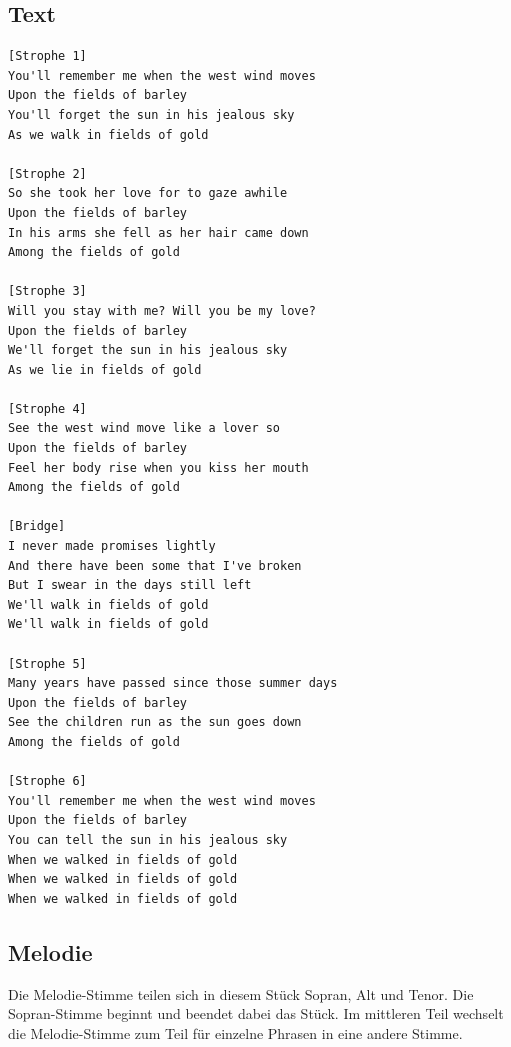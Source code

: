\subsection*{Text}

\begin{verbatim}
[Strophe 1]
You'll remember me when the west wind moves
Upon the fields of barley
You'll forget the sun in his jealous sky
As we walk in fields of gold

[Strophe 2]
So she took her love for to gaze awhile
Upon the fields of barley
In his arms she fell as her hair came down
Among the fields of gold

[Strophe 3]
Will you stay with me? Will you be my love?
Upon the fields of barley
We'll forget the sun in his jealous sky
As we lie in fields of gold

[Strophe 4]
See the west wind move like a lover so
Upon the fields of barley
Feel her body rise when you kiss her mouth
Among the fields of gold

[Bridge]
I never made promises lightly
And there have been some that I've broken
But I swear in the days still left
We'll walk in fields of gold
We'll walk in fields of gold

[Strophe 5]
Many years have passed since those summer days
Upon the fields of barley
See the children run as the sun goes down
Among the fields of gold

[Strophe 6]
You'll remember me when the west wind moves
Upon the fields of barley
You can tell the sun in his jealous sky
When we walked in fields of gold
When we walked in fields of gold
When we walked in fields of gold
\end{verbatim}

\subsection*{Melodie}

Die Melodie-Stimme teilen sich in diesem Stück Sopran, Alt und Tenor. Die Sopran-Stimme beginnt und beendet dabei das Stück. Im mittleren Teil wechselt die Melodie-Stimme zum Teil für einzelne Phrasen in eine andere Stimme.

